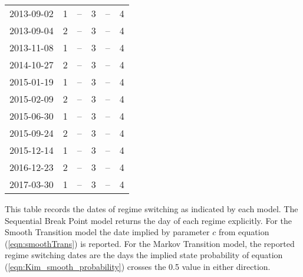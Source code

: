 \documentclass[12pt]{article}
\begin{document}
\begin{table}
\begin{tabular}[c]{r r | r r | r r}
		2013-09-02 &  1 &         -- &  3 &         -- &  4 \\
		2013-09-04 &  2 &         -- &  3 &         -- &  4 \\
		2013-11-08 &  1 &         -- &  3 &         -- &  4 \\
		2014-10-27 &  2 &         -- &  3 &         -- &  4 \\
		2015-01-19 &  1 &         -- &  3 &         -- &  4 \\
		2015-02-09 &  2 &         -- &  3 &         -- &  4 \\
		2015-06-30 &  1 &         -- &  3 &         -- &  4 \\
		2015-09-24 &  2 &         -- &  3 &         -- &  4 \\
		2015-12-14 &  1 &         -- &  3 &         -- &  4 \\
		2016-12-23 &  2 &         -- &  3 &         -- &  4 \\
		2017-03-30 &  1 &         -- &  3 &         -- &  4 \\
		\hline
	\end{tabular}
	\begin{tablenotes}
		\item{\footnotesize This table records the dates of regime switching as indicated by each model. The Sequential Break Point model returns the day of each regime explicitly. For the Smooth Transition model the date implied by parameter $c$ from equation (\ref{eqn:smoothTrans}) is reported. For the Markov Transition model, the reported regime switching dates are the days the implied state probability of equation (\ref{eqn:Kim_smooth_probability}) crosses the 0.5 value in either direction.}
	\end{tablenotes}
	\label{tbl:regime_changes_pound_yen}
\end{table}

\clearpage

\printbibliography
\end{document}
